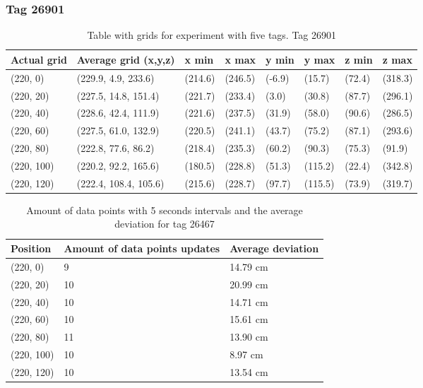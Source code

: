 \subsubsection{Tag 26901}
\begin{table}[H] 
    \centering
    \begin{tabular}{|l|l|l|l|l|l|l|l|}
    \hline
    Actual grid & Average grid (x,y,z)   & x min    & x max     & y min      & y max     & z min   & z max    \\ \hline
(220, 0) 	& (229.9, 4.9, 233.6)   	 & (214.6) 	& (246.5)	& (-6.9)	 & (15.7) 	 & (72.4)	 & (318.3)	\\ \hline
(220, 20) 	& (227.5, 14.8, 151.4)   	 & (221.7) 	& (233.4)	& (3.0)	     & (30.8) 	 & (87.7)	 & (296.1)	\\ \hline
(220, 40) 	& (228.6, 42.4, 111.9) 	     & (221.6) 	& (237.5)	& (31.9)	 & (58.0) 	 & (90.6)	 & (286.5)	\\ \hline
(220, 60) 	& (227.5, 61.0, 132.9) 	     & (220.5) 	& (241.1)	& (43.7)	 & (75.2) 	 & (87.1)	 & (293.6)	\\ \hline
(220, 80) 	& (222.8, 77.6, 86.2)    	 & (218.4) 	& (235.3)	& (60.2)	 & (90.3) 	 & (75.3)	 & (91.9)	\\ \hline
(220, 100) 	& (220.2, 92.2, 165.6) 	     & (180.5) 	& (228.8)	& (51.3)	 & (115.2) 	 & (22.4)	 & (342.8)	\\ \hline
(220, 120) 	& (222.4, 108.4, 105.6) 	 & (215.6) 	& (228.7)	& (97.7)	 & (115.5) 	 & (73.9)	 & (319.7)	\\ \hline
\end{tabular}
\caption{Table with grids for experiment with five tags. Tag 26901}
\end{table}

\begin{table}[H]
    \centering
    \begin{tabular}{|l|l|l|}
    \hline
    Position   & Amount of data points updates & Average deviation \\ \hline
    (220, 0)   & 9                 &  14.79 cm                 \\ \hline
    (220, 20)  & 10                &  20.99 cm                 \\ \hline
    (220, 40)  & 10                &  14.71 cm                 \\ \hline
    (220, 60)  & 10                &  15.61 cm                 \\ \hline
    (220, 80)  & 11                &  13.90 cm                 \\ \hline
    (220, 100) & 10                &  8.97 cm                 \\ \hline
    (220, 120) & 10                &  13.54 cm                 \\ \hline
    \end{tabular}
    \caption{Amount of data points with 5 seconds intervals and the average deviation for tag 26467}
\end{table}

